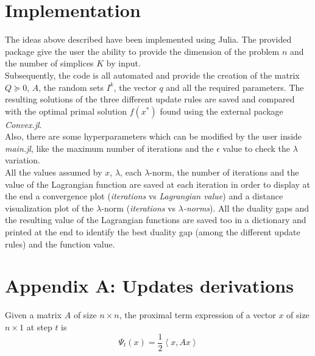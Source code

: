 \documentclass[notitlepage]{article}
\begin{document}
\section{Implementation}
The ideas above described have been implemented using Julia. The provided package give the user the ability to provide the dimension of the problem $n$ and the number of simplices $K$ by input.\\
Subsequently, the code is all automated and provide the creation of the matrix $Q \succeq 0$, $A$, the random sets $I^k$, the vector $q$ and all the required parameters. The resulting solutions 
of the three different update rules are saved and compared with the optimal primal solution $f(x^*)$ found using the external package \textit{Convex.jl}.\\
Also, there are some hyperparameters which can be modified by the user inside \textit{main.jl}, like the maximum number of iterations and the $\epsilon$ value to check the $\lambda$ variation.\\
All the values assumed by $x$, $\lambda$, each $\lambda$-norm, the number of iterations and the value of the Lagrangian function are saved at each iteration in order to display at the end a convergence plot 
(\textit{iterations} vs \textit{Lagrangian value}) and a distance visualization plot of the $\lambda$-norm (\textit{iterations} vs $\lambda$\textit{-norms}).
All the duality gaps and the resulting value of the Lagrangian functions are saved too in a dictionary and printed at the end to identify the best duality gap (among the different update rules) and 
the function value.

\newpage




\newpage

\appendix

\section{Appendix A: Updates derivations}
\label{sec:appendix}
Given a matrix $A$ of size $n \times n$, the proximal term expression of a vector $x$ of size $n\times 1$ at step $t$ is
\[
  \Psi_t(x) = \frac{1}{2} \left\langle x, A x \right\rangle  
\]
\end{document}
